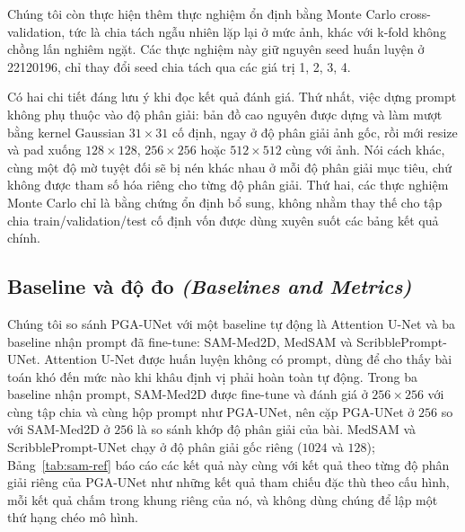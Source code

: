 \documentclass[11pt]{article}
\newcommand{\enlabel}[1]{{\small\itshape\color{gray} (#1)}}
\begin{document}
Chúng tôi còn thực hiện thêm thực nghiệm ổn định bằng Monte Carlo cross-validation, tức là chia tách ngẫu nhiên lặp lại ở mức ảnh, khác với k-fold không chồng lấn nghiêm ngặt. Các thực nghiệm này giữ nguyên seed huấn luyện ở 22120196, chỉ thay đổi seed chia tách qua các giá trị 1, 2, 3, 4.

Có hai chi tiết đáng lưu ý khi đọc kết quả đánh giá. Thứ nhất, việc dựng prompt không phụ thuộc vào độ phân giải: bản đồ cao nguyên được dựng và làm mượt bằng kernel Gaussian $31\times31$ cố định, ngay ở độ phân giải ảnh gốc, rồi mới resize và pad xuống $128\times128$, $256\times256$ hoặc $512\times512$ cùng với ảnh. Nói cách khác, cùng một độ mờ tuyệt đối sẽ bị nén khác nhau ở mỗi độ phân giải mục tiêu, chứ không được tham số hóa riêng cho từng độ phân giải. Thứ hai, các thực nghiệm Monte Carlo chỉ là bằng chứng ổn định bổ sung, không nhằm thay thế cho tập chia train/validation/test cố định vốn được dùng xuyên suốt các bảng kết quả chính.

\subsection{Baseline và độ đo \enlabel{Baselines and Metrics}}
Chúng tôi so sánh PGA-UNet với một baseline tự động là Attention U-Net và ba baseline nhận prompt đã fine-tune: SAM-Med2D, MedSAM và ScribblePrompt-UNet. Attention U-Net được huấn luyện không có prompt, dùng để cho thấy bài toán khó đến mức nào khi khâu định vị phải hoàn toàn tự động. Trong ba baseline nhận prompt, SAM-Med2D được fine-tune và đánh giá ở $256\times256$ với cùng tập chia và cùng hộp prompt như PGA-UNet, nên cặp PGA-UNet ở $256$ so với SAM-Med2D ở $256$ là so sánh khớp độ phân giải của bài. MedSAM và ScribblePrompt-UNet chạy ở độ phân giải gốc riêng ($1024$ và $128$); Bảng~\ref{tab:sam-ref} báo cáo các kết quả này cùng với kết quả theo từng độ phân giải riêng của PGA-UNet như những kết quả tham chiếu đặc thù theo cấu hình, mỗi kết quả chấm trong khung riêng của nó, và không dùng chúng để lập một thứ hạng chéo mô hình.
\end{document}
